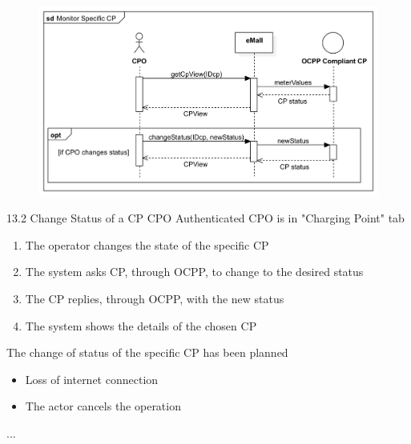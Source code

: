 \usecase
{
    \begin{figure}[H]
        \centering
        \includegraphics[scale=0.9]{src/sequence_diagram/monitorSpecificCP.png}
    \end{figure}
}
{13.2}
{Change Status of a CP} %
{CPO} %
{Authenticated CPO is in "Charging Point" tab} %
{ %
    \begin{enumerate}
        \item The operator changes the state of the specific CP
        \item The system asks CP, through OCPP, to change to the desired status
        \item The CP replies, through OCPP, with the new status
        \item The system shows the details of the chosen CP
    \end{enumerate}
}
{The change of status of the specific CP has been planned} %
{ %
    \begin{itemize}
        \item Loss of internet connection
        \item The actor cancels the operation
    \end{itemize}
}
{ %
    ...
}

